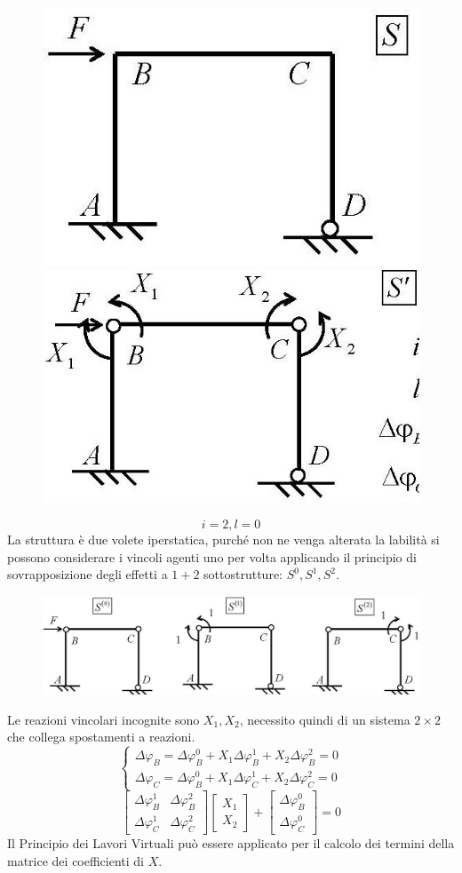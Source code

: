 \documentclass{article}
\begin{document}
\begin{adjustwidth}{2in}{}
\begin{figure}[H]
	\centering
	\includegraphics[width=0.3\linewidth]{"immagini/1.PARTE8_Pagina_69 (2)"}
	\includegraphics[width=0.3\linewidth]{"immagini/1.PARTE8_Pagina_69 (3)"}		
\end{figure}

		\[ i= 2, l=0\]
		La struttura è due volete iperstatica, purché non ne venga alterata la labilità si possono considerare i vincoli agenti uno per volta applicando il principio di sovrapposizione degli effetti a $ 1 + 2 $ sottostrutture: $S^0, S^1, S^2$.
		
\begin{figure}[H]
	\centering
	\includegraphics[width=0.7\linewidth]{"immagini/1.PARTE8_Pagina_69"}
\end{figure}
		Le reazioni vincolari incognite sono $X_1, X_2$, necessito quindi di un sistema $2\times2$  che collega spostamenti a reazioni.
		\[
		\begin{cases}
			\Delta\varphi_B = \Delta\varphi_B^0 + X_1\Delta\varphi_B^1 + X_2\Delta\varphi_B^2 = 0 \\
			\Delta\varphi_C = \Delta\varphi_B^0 + X_1\Delta\varphi_C^1 + X_2\Delta\varphi_C^2 = 0 
		\end{cases}
		\]
		\[
		\left[ \begin{matrix}
			\Delta\varphi_B^1 & \Delta\varphi_B^2 \\
			\Delta\varphi_C^1 & \Delta\varphi_C^2
		\end{matrix}\right] 
		\left[ \begin{array}{c}
		X_1 \\
		X_2
		\end{array}\right] 
		+
		\left[ \begin{array}{c}
			\Delta\varphi_B^0 \\
			\Delta\varphi_C^0
		\end{array}\right]  = 0
		\]
		Il Principio dei Lavori Virtuali può essere applicato per il calcolo dei termini della matrice dei
		coefficienti di $ X $.
		

\end{adjustwidth}
\end{document}

